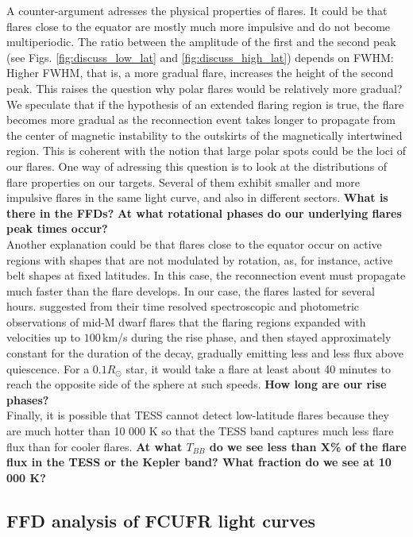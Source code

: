 \documentclass[fleqn,usenatbib,letters]{mnras}%
\begin{document}
A counter-argument adresses the physical properties of flares. It could be that flares close to the equator are mostly much more impulsive and do not become multiperiodic. The ratio between the amplitude of the first and the second peak (see Figs. \ref{fig:discuss_low_lat} and \ref{fig:discuss_high_lat}) depends on FWHM: Higher FWHM, that is, a more gradual flare, increases the height of the second peak. This raises the question why polar flares would be relatively more gradual? We speculate that if the hypothesis of an extended flaring region is true, the flare becomes more gradual as the reconnection event takes longer to propagate from the center of magnetic instability to the outskirts of the magnetically intertwined region. This is coherent with the notion that large polar spots could be the loci of our flares. One way of adressing this question is to look at the distributions of flare properties on our targets. Several of them exhibit smaller and more impulsive flares in the same light curve, and also in different sectors. \textbf{What is there in the FFDs?}  \textbf{At what rotational phases do our underlying flares peak times occur?}
\\
Another explanation could be that flares close to the equator occur on active regions with shapes that are not modulated by rotation, as, for instance, active belt shapes at fixed latitudes. In this case, the reconnection event must propagate much faster than the flare develops. In our case, the flares lasted for several hours. \citet{kowalski2013} suggested from their time resolved spectroscopic and photometric observations of mid-M dwarf flares that the flaring regions expanded with velocities up to $100$\,km/s during the rise phase, and then stayed approximately constant for the duration of the decay, gradually emitting less and less flux above quiescence. For a $0.1R_\odot$ star, it would take a flare at least about 40 minutes to reach the opposite side of the sphere at such speeds. \textbf{How long are our rise phases?}
\\
Finally, it is possible that TESS cannot detect low-latitude flares because they are much hotter than 10 000 K so that the TESS band captures much less flare flux than for cooler flares. \textbf{At what $T_{BB}$ do we see less than X\% of the flare flux in the TESS or the Kepler band? What fraction do we see at 10 000 K?}
\subsection{FFD analysis of FCUFR light curves}
\end{document}
